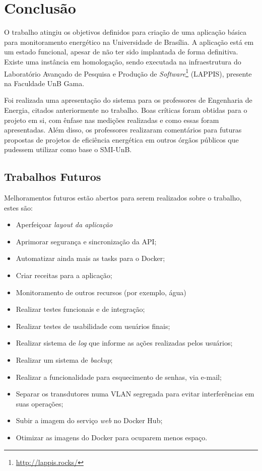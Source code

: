 \chapter{Conclusão}
O trabalho atingiu os objetivos definidos para criação de uma aplicação básica para monitoramento energético na Universidade de Brasília. A aplicação está em um estado funcional, apesar de não ter sido implantada de forma definitiva. Existe uma instância em homologação, sendo executada na infraestrutura do Laboratório Avançado de Pesquisa e Produção de \textit{Software}\footnote{\url{http://lappis.rocks/}} (LAPPIS), presente na Faculdade UnB Gama.

Foi realizada uma apresentação do sistema para os professores de Engenharia de Energia, citados anteriormente no trabalho. Boas críticas foram obtidas para o projeto em si, com ênfase nas medições realizadas e como essas foram apresentadas. Além disso, os professores realizaram comentários para futuras propostas de projetos de eficiência energética em outros órgãos públicos que pudessem utilizar como base o SMI-UnB.

\section{Trabalhos Futuros}
Melhoramentos futuros estão abertos para serem realizados sobre o trabalho, estes são:

\begin{itemize}
    \item Aperfeiçoar \textit{layout da aplicação}
    \item Aprimorar segurança e sincronização da API;
    \item Automatizar ainda mais as tasks para o Docker;
    \item Criar receitas para a aplicação;
    \item Monitoramento de outros recursos (por exemplo, água)
    \item Realizar testes funcionais e de integração;
    \item Realizar testes de usabilidade com usuários finais;
    \item Realizar sistema de \textit{log} que informe as ações realizadas pelos usuários;
    \item Realizar um sistema de \textit{backup};
    \item Realizar a funcionalidade para esquecimento de senhas, via e-mail;
    \item Separar os transdutores numa VLAN segregada para evitar interferências em suas operações;
    \item Subir a imagem do serviço \textit{web} no Docker Hub;
    \item Otimizar as imagens do Docker para ocuparem menos espaço.
\end{itemize}

